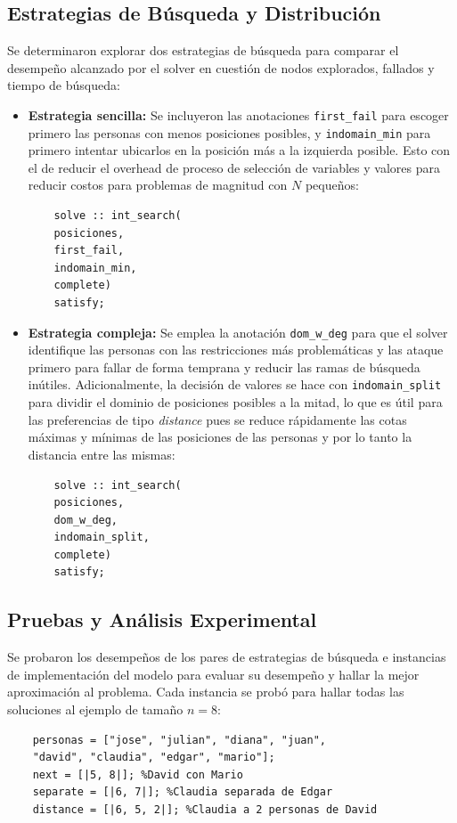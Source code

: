 \subsection{Estrategias de Búsqueda y Distribución}
Se determinaron explorar dos estrategias de búsqueda para comparar el desempeño alcanzado por el solver en cuestión de nodos explorados, fallados y tiempo de búsqueda:
\begin{itemize}
    \item \textbf{Estrategia sencilla:} Se incluyeron las anotaciones \verb|first_fail| para escoger primero las personas con menos posiciones posibles, y \verb|indomain_min| para primero intentar ubicarlos en la posición más a la izquierda posible. Esto con el de reducir el overhead de proceso de selección de variables y valores para reducir costos para problemas de magnitud con $N$ pequeños:
    \begin{verbatim}
    solve :: int_search(
    posiciones,         
    first_fail, 
    indomain_min, 
    complete) 
    satisfy;
    \end{verbatim}

    \item \textbf{Estrategia compleja:} Se emplea la anotación \verb|dom_w_deg| para que el solver identifique las personas con las restricciones más problemáticas y las ataque primero para fallar de forma temprana y reducir las ramas de búsqueda inútiles. Adicionalmente, la decisión de valores se hace con \verb|indomain_split| para dividir el dominio de posiciones posibles a la mitad, lo que es útil para las preferencias de tipo \textit{distance} pues se reduce rápidamente las cotas máximas y mínimas de las posiciones de las personas y por lo tanto la distancia entre las mismas:
    \begin{verbatim}
    solve :: int_search(
    posiciones,         
    dom_w_deg, 
    indomain_split, 
    complete) 
    satisfy;
    \end{verbatim}
    
\end{itemize}
\subsection{Pruebas y Análisis Experimental}
Se probaron los desempeños de los pares de estrategias de búsqueda e instancias de implementación del modelo para evaluar su desempeño y hallar la mejor aproximación al problema. Cada instancia se probó para hallar todas las soluciones al ejemplo de tamaño $n=8$:
\begin{verbatim}
    personas = ["jose", "julian", "diana", "juan",
    "david", "claudia", "edgar", "mario"];
    next = [|5, 8|]; %David con Mario
    separate = [|6, 7|]; %Claudia separada de Edgar
    distance = [|6, 5, 2|]; %Claudia a 2 personas de David
\end{verbatim}

